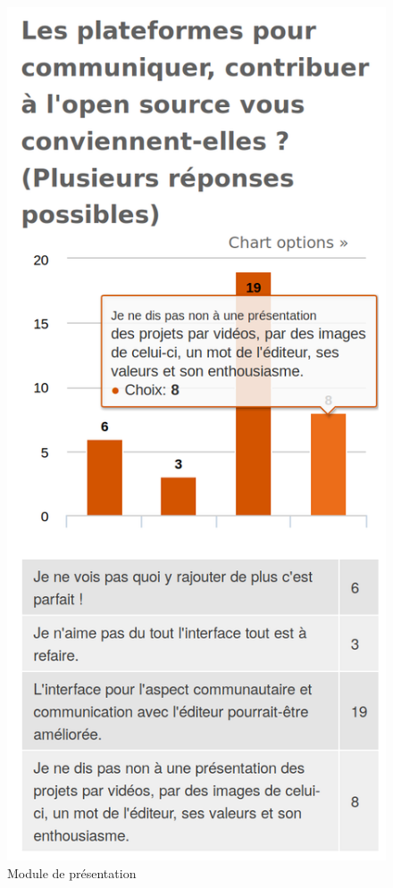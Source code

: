 			\begin{figure}[!htb]
				\center
				\includegraphics[scale=0.28]{./img/a92}
				\caption{Module de présentation}
			\end{figure}

